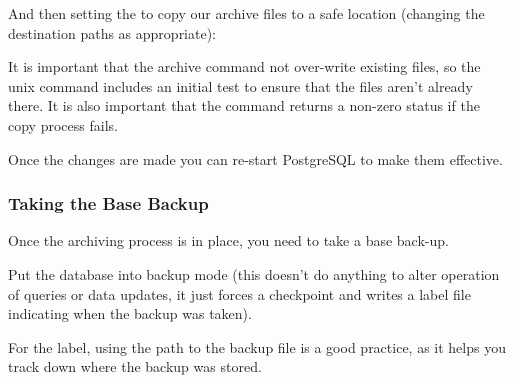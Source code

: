 \documentclass[a4paper,11pt,english]{sphinxmanual}
\begin{document}
And then setting the  to copy our archive files to a safe location (changing the destination paths as appropriate):

\begin{sphinxVerbatim}[commandchars=\\\{\}]
  

  
\end{sphinxVerbatim}

It is important that the archive command not over-write existing files, so the unix command includes an initial test to ensure that the files aren’t already there. It is also important that the command returns a non-zero status if the copy process fails.

Once the changes are made you can re-start PostgreSQL to make them effective.


\subsubsection{Taking the Base Backup}
\label{\detokenize{maintenance:taking-the-base-backup}}
Once the archiving process is in place, you need to take a base back-up.

Put the database into backup mode (this doesn’t do anything to alter operation of queries or data updates, it just forces a checkpoint and writes a label file indicating when the backup was taken).

\begin{sphinxVerbatim}[commandchars=\\\{\}]
 
\end{sphinxVerbatim}

For the label, using the path to the backup file is a good practice, as it helps you track down where the backup was stored.
\end{document}
